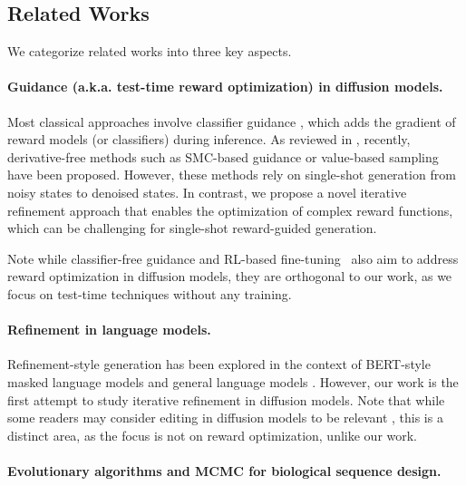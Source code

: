 \subsection{Related Works}\label{sec:related_works}
We categorize related works into three key aspects.
\paragraph{Guidance (a.k.a. test-time reward optimization) in diffusion models.} 

Most classical approaches involve classifier guidance \citep{dhariwal2021diffusion, song2021score}, which adds the gradient of reward models (or classifiers) during inference. As reviewed in \citep{uehara2025reward}, recently, derivative-free methods such as SMC-based guidance \citep{wu2024practical, dou2024diffusion, phillips2024particle,cardoso2023monte} or value-based sampling \citep{li2024derivative} have been proposed. However, these methods rely on single-shot generation from noisy states to denoised states. In contrast, we propose a novel iterative refinement approach that enables the optimization of complex reward functions, which can be challenging for single-shot reward-guided generation. 

Note while classifier-free guidance \citep{ho2022classifier} and RL-based fine-tuning~\citep{fan2023dpok,black2023training} also aim to address reward optimization in diffusion models, they are orthogonal to our work, as we focus on test-time techniques without any training.

\vspace{-2mm} \paragraph{Refinement in language models.}   

Refinement-style generation has been explored in the context of BERT-style masked language models and general language models \citep{novak2016iterative, guu2018generating, wang2019bert,welleck2022generating, padmakumar2023extrapolative}. However, our work is the first attempt to study iterative refinement in diffusion models. Note that while some readers may consider editing in diffusion models \citep{huang2024diffusion} to be relevant
, this is a distinct area, as the focus is not on reward optimization, unlike our work.

\vspace{-2mm}
\paragraph{Evolutionary algorithms and MCMC for biological sequence design.}

